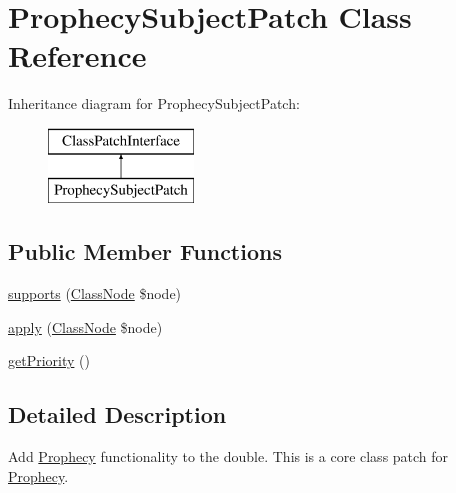 \hypertarget{class_prophecy_1_1_doubler_1_1_class_patch_1_1_prophecy_subject_patch}{}\section{Prophecy\+Subject\+Patch Class Reference}
\label{class_prophecy_1_1_doubler_1_1_class_patch_1_1_prophecy_subject_patch}
Inheritance diagram for Prophecy\+Subject\+Patch\+:\begin{figure}[H]
\begin{center}
\leavevmode
\includegraphics[height=2.000000cm]{class_prophecy_1_1_doubler_1_1_class_patch_1_1_prophecy_subject_patch}
\end{center}
\end{figure}
\subsection*{Public Member Functions}
\begin{DoxyCompactItemize}
\item 
\mbox{\hyperlink{class_prophecy_1_1_doubler_1_1_class_patch_1_1_prophecy_subject_patch_a99b2455ac194faf79aff042c55719ac2}{supports}} (\mbox{\hyperlink{class_prophecy_1_1_doubler_1_1_generator_1_1_node_1_1_class_node}{Class\+Node}} \$node)
\item 
\mbox{\hyperlink{class_prophecy_1_1_doubler_1_1_class_patch_1_1_prophecy_subject_patch_a62fdb697928f35fc782d6889b8fe9b8b}{apply}} (\mbox{\hyperlink{class_prophecy_1_1_doubler_1_1_generator_1_1_node_1_1_class_node}{Class\+Node}} \$node)
\item 
\mbox{\hyperlink{class_prophecy_1_1_doubler_1_1_class_patch_1_1_prophecy_subject_patch_a1e7a3c168dcd0901a0d2669c67575b55}{get\+Priority}} ()
\end{DoxyCompactItemize}


\subsection{Detailed Description}
Add \mbox{\hyperlink{namespace_prophecy_1_1_prophecy}{Prophecy}} functionality to the double. This is a core class patch for \mbox{\hyperlink{namespace_prophecy_1_1_prophecy}{Prophecy}}.

